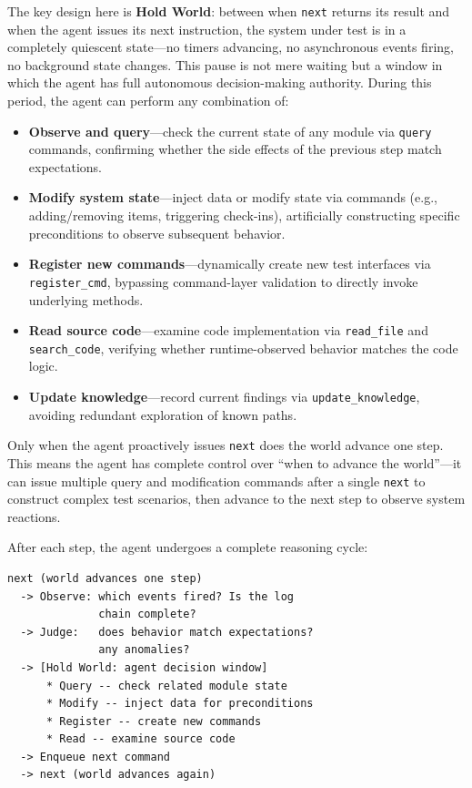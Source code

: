 \documentclass[sigconf,nonacm]{acmart}
\begin{document}
The key design here is \textbf{Hold World}: between when \texttt{next} returns its result and when the agent issues its next instruction, the system under test is in a completely quiescent state---no timers advancing, no asynchronous events firing, no background state changes. This pause is not mere waiting but a window in which the agent has full autonomous decision-making authority. During this period, the agent can perform any combination of:

\begin{itemize}
\item \textbf{Observe and query}---check the current state of any module via \texttt{query} commands, confirming whether the side effects of the previous step match expectations.
\item \textbf{Modify system state}---inject data or modify state via commands (e.g., adding/removing items, triggering check-ins), artificially constructing specific preconditions to observe subsequent behavior.
\item \textbf{Register new commands}---dynamically create new test interfaces via \texttt{register\_cmd}, bypassing command-layer validation to directly invoke underlying methods.
\item \textbf{Read source code}---examine code implementation via \texttt{read\_file} and \texttt{search\_code}, verifying whether runtime-observed behavior matches the code logic.
\item \textbf{Update knowledge}---record current findings via \texttt{update\_knowledge}, avoiding redundant exploration of known paths.
\end{itemize}

Only when the agent proactively issues \texttt{next} does the world advance one step. This means the agent has complete control over ``when to advance the world''---it can issue multiple query and modification commands after a single \texttt{next} to construct complex test scenarios, then advance to the next step to observe system reactions.

After each step, the agent undergoes a complete reasoning cycle:

\begin{lstlisting}[basicstyle=\ttfamily\footnotesize]
next (world advances one step)
  -> Observe: which events fired? Is the log
              chain complete?
  -> Judge:   does behavior match expectations?
              any anomalies?
  -> [Hold World: agent decision window]
      * Query -- check related module state
      * Modify -- inject data for preconditions
      * Register -- create new commands
      * Read -- examine source code
  -> Enqueue next command
  -> next (world advances again)
\end{lstlisting}
\end{document}
